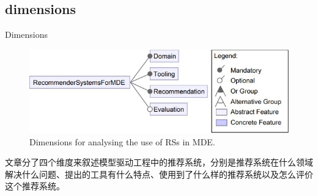 \documentclass{beamer}
\begin{document}
\subsection{dimensions}
\begin{frame}{Dimensions}
    \begin{figure}
        \centering
        \includegraphics[width = \linewidth]{RS4MDE-pic/4dimensions.jpg}
        \caption{Dimensions for analysing the use of RSs in MDE.}
    \end{figure}
    文章分了四个维度来叙述模型驱动工程中的推荐系统，分别是推荐系统在什么领域解决什么问题、提出的工具有什么特点、使用到了什么样的推荐系统以及怎么评价这个推荐系统。
\end{frame}
\end{document}
